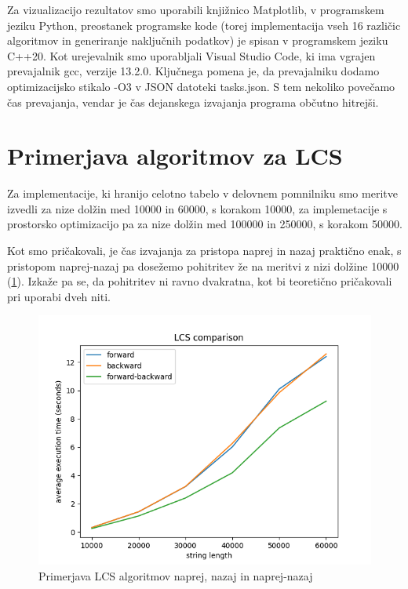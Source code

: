 \documentclass[a4paper,12pt,openright]{book}
\begin{document}
Za vizualizacijo rezultatov smo uporabili knjižnico Matplotlib, v programskem jeziku Python, preostanek programske kode (torej implementacija vseh 16 različic algoritmov in generiranje naključnih podatkov) je spisan v programskem jeziku C++20. Kot urejevalnik smo uporabljali Visual Studio Code, ki ima vgrajen prevajalnik gcc, verzije 13.2.0. Ključnega pomena je, da prevajalniku dodamo optimizacijsko stikalo -O3 \cite{compilerFlag} v JSON datoteki tasks.json. S tem nekoliko povečamo čas prevajanja, vendar je čas dejanskega izvajanja programa občutno hitrejši. 




\section{Primerjava algoritmov za LCS}

Za implementacije, ki hranijo celotno tabelo v delovnem pomnilniku smo meritve izvedli za nize dolžin med 10000 in 60000, s korakom 10000, za implemetacije s prostorsko optimizacijo pa za nize dolžin med 100000 in 250000, s korakom 50000. 

Kot smo pričakovali, je čas izvajanja za pristopa naprej in nazaj praktično enak, s pristopom naprej-nazaj pa dosežemo pohitritev že na meritvi z nizi dolžine 10000 (\ref{comparison1}). Izkaže pa se, da pohitritev ni ravno dvakratna, kot bi teoretično pričakovali pri uporabi dveh niti. 


\begin{figure}[htb]
\begin{center}
\includegraphics[width=1.0\textwidth]{plots/LCS_comparison.png}
\end{center}
\caption{Primerjava LCS algoritmov naprej, nazaj in naprej-nazaj}
\label{comparison1}
\end{figure}
\end{document}
